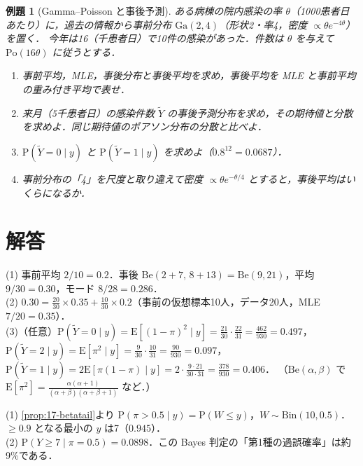 \documentclass[a4paper,11pt,openany]{ltjsbook}
\newtheorem{reidai}{例題}[chapter]
\newenvironment{kaitou}[1]{%
  \par\medskip\noindent
  \begin{tcolorbox}[enhanced,breakable,colback=bkgray!3,colframe=bkgray!60,boxrule=0.4pt,
    left=4pt,right=4pt,top=2pt,bottom=2pt,arc=1pt,
    title={\cref{#1}の解答},fonttitle=\bfseries\small,coltitle=white,colbacktitle=bkgray!80]}%
  {\end{tcolorbox}\par}
\newcommand{\E}{\mathrm{E}}
\newcommand{\Prob}{\mathrm{P}}
\newcommand{\Bin}{\mathrm{Bin}}
\newcommand{\Po}{\mathrm{Po}}
\newcommand{\Ga}{\mathrm{Ga}}
\newcommand{\Be}{\mathrm{Be}}
\begin{document}
\begin{reidai}[Gamma--Poisson と事後予測]\label{reidai:17-3}
ある病棟の院内感染の率 $\theta$（1000患者日あたり）に，過去の情報から事前分布 $\Ga(2,4)$（形状2・率4，密度 $\propto\theta e^{-4\theta}$）を置く．
今年は16（千患者日）で10件の感染があった．件数は $\theta$ を与えて $\Po(16\theta)$ に従うとする．
\begin{enumerate}[label=(\arabic*)]
\item 事前平均，MLE，事後分布と事後平均を求め，事後平均を MLE と事前平均の重み付き平均で表せ．
\item 来月（5千患者日）の感染件数 $\tilde Y$ の事後予測分布を求め，その期待値と分散を求めよ．同じ期待値のポアソン分布の分散と比べよ．
\item $\Prob(\tilde Y=0\mid y)$ と $\Prob(\tilde Y=1\mid y)$ を求めよ（$0.8^{12}=0.0687$）．
\item 事前分布の「4」を尺度と取り違えて密度 $\propto\theta e^{-\theta/4}$ とすると，事後平均はいくらになるか．
\end{enumerate}
\end{reidai}

\section{解答}\label{sec:17-sol}
\begin{kaitou}{reidai:17-1}
(1) 事前平均 $2/10=0.2$．事後 $\Be(2+7,\,8+13)=\Be(9,21)$，平均 $9/30=0.30$，モード $8/28=0.286$．\\
(2) $0.30=\frac{20}{30}\times0.35+\frac{10}{30}\times0.2$（事前の仮想標本10人，データ20人，MLE $7/20=0.35$）．\\
(3)（任意）$\Prob(\tilde Y=0\mid y)=\E[(1-\pi)^2\mid y]=\frac{21}{30}\cdot\frac{22}{31}=\frac{462}{930}=0.497$，
$\Prob(\tilde Y=2\mid y)=\E[\pi^2\mid y]=\frac{9}{30}\cdot\frac{10}{31}=\frac{90}{930}=0.097$，
$\Prob(\tilde Y=1\mid y)=2\E[\pi(1-\pi)\mid y]=2\cdot\frac{9\cdot21}{30\cdot31}=\frac{378}{930}=0.406$．
（$\Be(\alpha,\beta)$ で $\E[\pi^2]=\frac{\alpha(\alpha+1)}{(\alpha+\beta)(\alpha+\beta+1)}$ など．）
\end{kaitou}

\begin{kaitou}{reidai:17-2}
(1) \cref{prop:17-betatail}より $\Prob(\pi>0.5\mid y)=\Prob(W\le y)$，$W\sim\Bin(10,0.5)$．$\ge0.9$ となる最小の $y$ は7（$0.945$）．\\
(2) $\Prob(Y\ge7\mid\pi=0.5)=0.0898$．この Bayes 判定の「第1種の過誤確率」は約9\%である．
\end{kaitou}
\end{document}
